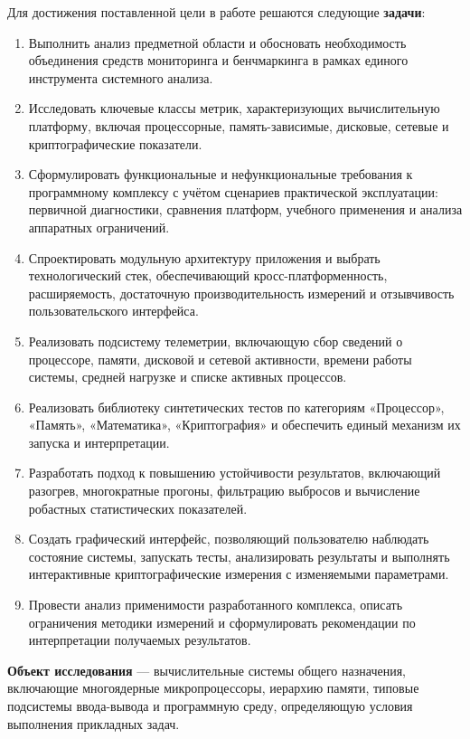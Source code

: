 Для достижения поставленной цели в работе решаются следующие \textbf{задачи}:
\begin{enumerate}
    \item Выполнить анализ предметной области и обосновать необходимость объединения средств мониторинга и бенчмаркинга в рамках единого инструмента системного анализа.
    \item Исследовать ключевые классы метрик, характеризующих вычислительную платформу, включая процессорные, память-зависимые, дисковые, сетевые и криптографические показатели.
    \item Сформулировать функциональные и нефункциональные требования к программному комплексу с учётом сценариев практической эксплуатации: первичной диагностики, сравнения платформ, учебного применения и анализа аппаратных ограничений.
    \item Спроектировать модульную архитектуру приложения и выбрать технологический стек, обеспечивающий кросс-платформенность, расширяемость, достаточную производительность измерений и отзывчивость пользовательского интерфейса.
    \item Реализовать подсистему телеметрии, включающую сбор сведений о процессоре, памяти, дисковой и сетевой активности, времени работы системы, средней нагрузке и списке активных процессов.
    \item Реализовать библиотеку синтетических тестов по категориям «Процессор», «Память», «Математика», «Криптография» и обеспечить единый механизм их запуска и интерпретации.
    \item Разработать подход к повышению устойчивости результатов, включающий разогрев, многократные прогоны, фильтрацию выбросов и вычисление робастных статистических показателей.
    \item Создать графический интерфейс, позволяющий пользователю наблюдать состояние системы, запускать тесты, анализировать результаты и выполнять интерактивные криптографические измерения с изменяемыми параметрами.
    \item Провести анализ применимости разработанного комплекса, описать ограничения методики измерений и сформулировать рекомендации по интерпретации получаемых результатов.
\end{enumerate}

\textbf{Объект исследования} --- вычислительные системы общего назначения, включающие многоядерные микропроцессоры, иерархию памяти, типовые подсистемы ввода-вывода и программную среду, определяющую условия выполнения прикладных задач.

